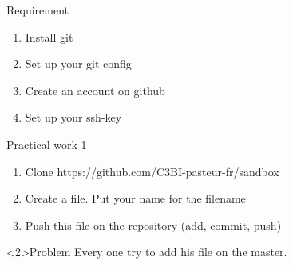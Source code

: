 %




 
\begin{frame}{Requirement}
    \begin{enumerate}
        \item Install git
        \item Set up your git config
        \item Create an account on github
        \item Set up your ssh-key
    \end{enumerate}
\end{frame}

\begin{frame}{Practical work 1}
    \begin{enumerate}
        \item Clone https://github.com/C3BI-pasteur-fr/sandbox
        \item Create a file. Put your name for the filename
        \item Push this file on the repository (add, commit, push)
    \end{enumerate}
    \begin{alertblock}<2>{Problem}
        Every one try to add his file on the master.
    \end{alertblock}
\end{frame}


